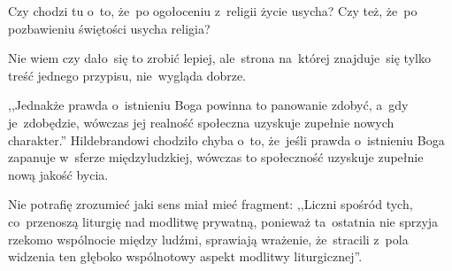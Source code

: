\documentclass[a4paper,11pt]{article}
\begin{document}



\start {} Czy chodzi tu o~to, że~po ogołoceniu z~religii
życie usycha? Czy też, że~po pozbawieniu świętości usycha religia?

\vspace{\spaceFour}


\start {} Nie wiem czy dało~się to zrobić lepiej, ale~strona
na~której znajduje~się tylko treść jednego przypisu, nie~wygląda
dobrze.

\vspace{\spaceFour}


\start {} ,,Jednakże prawda o~istnieniu Boga powinna to
panowanie zdobyć, a~gdy je~zdobędzie, wówczas jej realność społeczna
uzyskuje zupełnie nowych charakter.'' Hildebrandowi chodziło chyba
o~to, że~jeśli prawda o~istnieniu Boga zapanuje w~sferze
międzyludzkiej, wówczas to społeczność uzyskuje zupełnie nową jakość
bycia.

\vspace{\spaceFour}


\start {} Nie potrafię zrozumieć jaki sens miał mieć fragment:
,,Liczni spośród tych, co~przenoszą liturgię nad modlitwę prywatną,
ponieważ ta~ostatnia nie sprzyja rzekomo wspólnocie między ludźmi,
sprawiają wrażenie, że~stracili z~pola widzenia ten głęboko
wspólnotowy aspekt modlitwy liturgicznej''.
\end{document}
